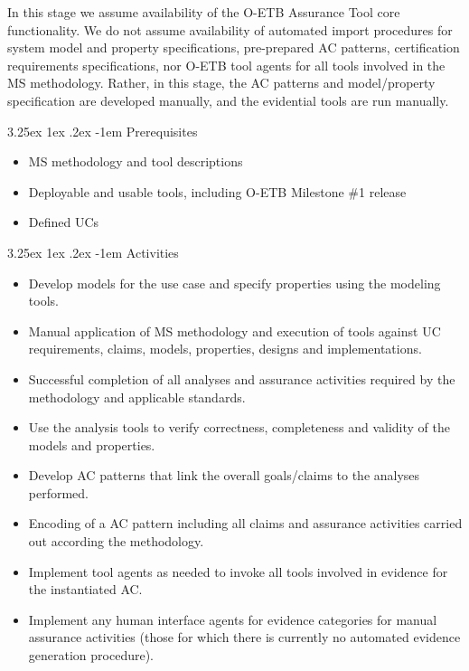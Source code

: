 \documentclass[12pt,twoside,a4paper]{article}
\makeatletter
\renewcommand\paragraph{\@startsection{paragraph}{5}{\z@}%
  {3.25ex \@plus1ex \@minus.2ex}%
  {-1em}%
  {\normalfont\normalsize\bfseries}}
\makeatother
\begin{document}
In this stage we assume availability of the O-ETB Assurance Tool core functionality. We do not assume availability of automated import procedures for system model and property specifications, pre-prepared AC patterns, certification requirements specifications, nor O-ETB tool agents for all tools involved in the MS methodology. Rather, in this stage, the AC patterns and model/property specification are developed manually, and the evidential tools are run manually.

\hypertarget{prerequisites-1}{%
\paragraph{Prerequisites}\label{prerequisites-1}}

\begin{itemize}
\item
  MS methodology and tool descriptions
\item
  Deployable and usable tools, including O-ETB Milestone \#1 release
\item
  Defined UCs
\end{itemize}

\hypertarget{activities}{%
\paragraph{Activities}\label{activities}}

\begin{itemize}
\item
  Develop models for the use case and specify properties using the modeling tools.
\item
  Manual application of MS methodology and execution of tools against UC requirements, claims, models, properties, designs and implementations.
\item
  Successful completion of all analyses and assurance activities required by the methodology and applicable standards.
\item
  Use the analysis tools to verify correctness, completeness and validity of the models and properties.
\item
  Develop AC patterns that link the overall goals/claims to the analyses performed.
\item
  Encoding of a AC pattern including all claims and assurance activities carried out according the methodology.
\item
  Implement tool agents as needed to invoke all tools involved in evidence for the instantiated AC.
\item
  Implement any human interface agents for evidence categories for manual assurance activities (those for which there is currently no automated evidence generation procedure).
\end{itemize}
\end{document}
